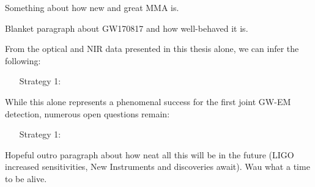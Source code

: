 Something about how new and great MMA is.

Blanket paragraph about GW170817 and how well-behaved it is.

From the optical and NIR data presented in this thesis alone, we can infer the following:
{\small \begin{enumerate}[leftmargin = 2.5cm]
\item[Strategy 1:] 
\end{enumerate}}

While this alone represents a phenomenal success for the first joint GW-EM detection, numerous open questions remain:

{\small \begin{enumerate}[leftmargin = 2.5cm]
\item[Strategy 1:] 
\end{enumerate}}

Hopeful outro paragraph about how neat all this will be in the future (LIGO increased sensitivities, New Instruments and discoveries await). Wau what a time to be alive.

